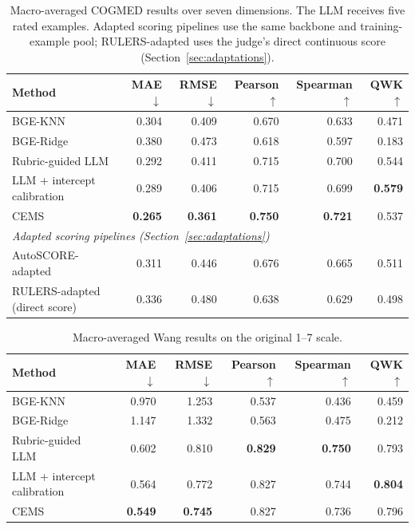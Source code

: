 \begin{table}[t]
\centering
\small
\setlength{\tabcolsep}{7pt}
\caption{Macro-averaged COGMED results over seven dimensions. The LLM receives five rated examples. Adapted scoring pipelines use the same backbone and training-example pool; RULERS-adapted uses the judge's direct continuous score (Section~\ref{sec:adaptations}).}
\label{tab:cogmed}
\begin{tabular}{lrrrrr}
\toprule
Method & MAE $\downarrow$ & RMSE $\downarrow$ & Pearson $\uparrow$ & Spearman $\uparrow$ & QWK $\uparrow$\\
\midrule
BGE-KNN & 0.304 & 0.409 & 0.670 & 0.633 & 0.471\\
BGE-Ridge & 0.380 & 0.473 & 0.618 & 0.597 & 0.183\\
Rubric-guided LLM & 0.292 & 0.411 & 0.715 & 0.700 & 0.544\\
LLM + intercept calibration & 0.289 & 0.406 & 0.715 & 0.699 & \textbf{0.579}\\
CEMS & \textbf{0.265} & \textbf{0.361} & \textbf{0.750} & \textbf{0.721} & 0.537\\
\midrule
\multicolumn{6}{l}{\textit{Adapted scoring pipelines (Section~\ref{sec:adaptations})}}\\
AutoSCORE-adapted & 0.311 & 0.446 & 0.676 & 0.665 & 0.511\\
RULERS-adapted (direct score) & 0.336 & 0.480 & 0.638 & 0.629 & 0.498\\
\bottomrule
\end{tabular}
\end{table}
\begin{table}[t]
\centering
\small
\setlength{\tabcolsep}{7pt}
\caption{Macro-averaged Wang results on the original 1--7 scale.}
\label{tab:wang}
\begin{tabular}{lrrrrr}
\toprule
Method & MAE $\downarrow$ & RMSE $\downarrow$ & Pearson $\uparrow$ & Spearman $\uparrow$ & QWK $\uparrow$\\
\midrule
BGE-KNN & 0.970 & 1.253 & 0.537 & 0.436 & 0.459\\
BGE-Ridge & 1.147 & 1.332 & 0.563 & 0.475 & 0.212\\
Rubric-guided LLM & 0.602 & 0.810 & \textbf{0.829} & \textbf{0.750} & 0.793\\
LLM + intercept calibration & 0.564 & 0.772 & 0.827 & 0.744 & \textbf{0.804}\\
CEMS & \textbf{0.549} & \textbf{0.745} & 0.827 & 0.736 & 0.796\\
\bottomrule
\end{tabular}
\end{table}

